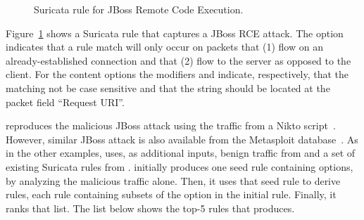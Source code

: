 \documentclass[sigconf,review, anonymous]{acmart}
\begin{document}


\begin{figure}[H]
  
  \caption{\label{fig:rule-jboss}Suricata rule for JBoss Remote Code Execution.}
\end{figure}


Figure~\ref{fig:rule-jboss} shows a Suricata rule that captures a
JBoss RCE attack.  The option 
indicates that a rule match will only occur on packets that (1) flow
on an already-established connection and that (2) flow to the server
as opposed to the client. For the content options the modifiers
 and  indicate, respectively, that
the matching not be case sensitive and that the string should be
located at the packet field ``Request URI''. 

\tname{} reproduces the malicious JBoss attack using the traffic from
a Nikto script~\cite{nikto}. However, similar JBoss attack is also
available from the Metasploit database~\cite{metasploit}. As in the
other examples, \tname{} uses, as additional inputs, benign traffic
from  and a set of existing Suricata rules from
. \tname{} initially produces one seed rule containing
 options, by analyzing the malicious traffic alone. Then, it
uses that seed rule to derive  rules, each rule containing
subsets of the option in the initial rule. Finally, it ranks that
list. The list below shows the top-5 rules that \tname{}
produces.
\end{document}
